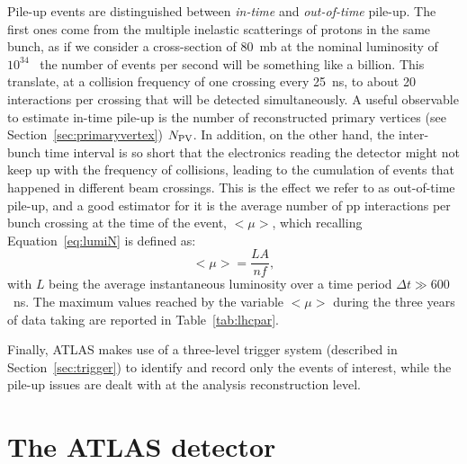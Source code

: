 Pile-up events are distinguished between \textit{in-time} and \textit{out-of-time} pile-up. The first ones come 
from the multiple inelastic scatterings of protons in the same bunch, as if we consider a cross-section of 80~mb
at the nominal luminosity of $10^{34}$~ the number of events per second will be something like
a billion. This translate, at a collision frequency of one crossing every 25~ns, to about 20 interactions per
crossing that will be detected simultaneously. A useful observable to estimate in-time pile-up is
the number of reconstructed primary vertices (see Section~\ref{sec:primaryvertex}) $N_{\rm PV}$.
In addition, on the other hand, the inter-bunch time interval is so short
that the electronics reading the detector might not keep up with the frequency of collisions, leading to the
cumulation of events that happened in different beam crossings. This is the effect we refer to as 
out-of-time pile-up, and a good estimator for it is the average number of pp interactions
per bunch crossing at the time of the event, $<\mu>$, which recalling Equation~\ref{eq:lumiN} is defined as:
\begin{equation}\label{eq:mu}
<\mu> = \dfrac{LA}{nf},
\end{equation}
with $L$ being the average instantaneous luminosity over a time period $\Delta t\gg 600$~ns.
The maximum values reached by the variable $<\mu>$ during the three years of data taking
are reported in Table~\ref{tab:lhcpar}.

Finally, ATLAS makes use of a three-level trigger system (described in Section~\ref{sec:trigger}) to identify
and record only the events of interest, while the pile-up issues are dealt with at the analysis 
reconstruction level.



\section{The ATLAS detector}\label{sec:atlas}

